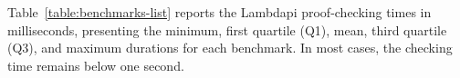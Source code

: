 Table~\ref{table:benchmarks-list} reports the Lambdapi proof-checking times in milliseconds, presenting the minimum, first quartile (Q1), mean, third quartile (Q3), and maximum durations for each benchmark.
In most cases, the checking time remains below one second.
